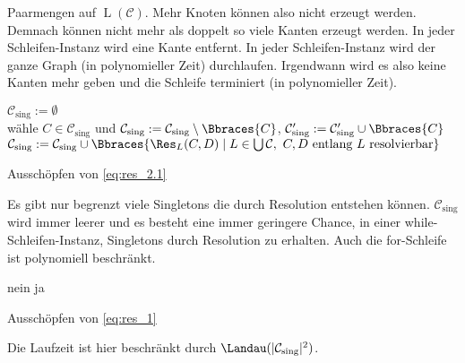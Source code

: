 \begin{solution}
Paarmengen auf $\operatorname L(\mathcal C)$.
Mehr Knoten können also nicht erzeugt werden.
Demnach können nicht mehr als doppelt so viele Kanten erzeugt werden.
In jeder Schleifen-Instanz wird eine Kante entfernt.
In jeder Schleifen-Instanz wird der ganze Graph (in polynomieller Zeit) durchlaufen.
Irgendwann wird es also keine Kanten mehr geben und die Schleife terminiert (in polynomieller Zeit).

\begin{algorithm}[H]
    $\mathcal C_\text{sing} := \emptyset$ \\
    {
        wähle $C \in \mathcal C_\text{sing}$ und $\mathcal C_\text{sing} := \mathcal C_\text{sing} \setminus \Bbraces{C}$, $\mathcal C_\text{sing}^\prime := \mathcal C_\text{sing}^\prime \cup \Bbraces{C}$ \\
        {
            $\mathcal C_\text{sing} := \mathcal C_\text{sing} \cup \Bbraces{\Res_L(C, D) \mid L \in \bigcup \mathcal C, ~ C, D ~\text{entlang}~ L ~\text{resolvierbar}}$ \\
        }
    }
    \caption
    {
        Ausschöpfen von \eqref{eq:res_2.1}
    }
\end{algorithm}

Es gibt nur begrenzt viele Singletons die durch Resolution entstehen können.
$\mathcal C_\text{sing}$ wird immer leerer und es besteht eine immer geringere Chance, in einer while-Schleifen-Instanz, Singletons durch Resolution zu erhalten.
Auch die for-Schleife ist polynomiell beschränkt.

\begin{algorithm}[H]
    {
        {
            {
                \KwRet nein
            }
        }
    }
    \KwRet ja
    \caption
    {
        Ausschöpfen von \eqref{eq:res_1}
    }
\end{algorithm}

Die Laufzeit ist hier beschränkt durch $\Landau(|\mathcal C_\text{sing}|^2)$.

\end{solution}

